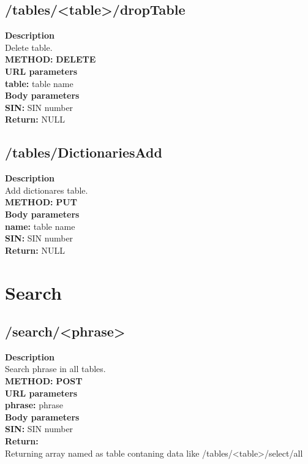 \documentclass[a4paper, 12pt]{report}
\begin{document}
\subsection{/tables/<table>/dropTable}
\textbf{\color{redText} Description} \\
Delete table. \\
\textbf{\color{redText} METHOD: } \textbf{DELETE} \\
\textbf{\color{redText} URL parameters} \\
\textbf{table: } table name\\
\textbf{\color{redText} Body parameters} \\
\textbf{SIN: } SIN number\\
\textbf{\color{redText} Return: } NULL

\subsection{/tables/DictionariesAdd}
\textbf{\color{redText} Description} \\
Add dictionares table. \\
\textbf{\color{redText} METHOD: } \textbf{PUT} \\
\textbf{\color{redText} Body parameters} \\
\textbf{name: } table name\\
\textbf{SIN: } SIN number\\
\textbf{\color{redText} Return: } NULL

\section{Search}
\subsection{/search/<phrase>}
\textbf{\color{redText} Description} \\
Search phrase in all tables. \\
\textbf{\color{redText} METHOD: } \textbf{POST} \\
\textbf{\color{redText} URL parameters} \\
\textbf{phrase: } phrase\\
\textbf{\color{redText} Body parameters} \\
\textbf{SIN: } SIN number\\
\textbf{\color{redText} Return: } \\
Returning array named as table contaning data like /tables/<table>/select/all
\end{document}
